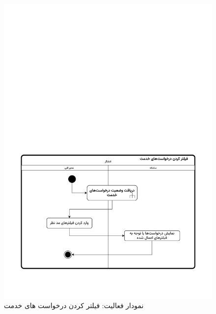 \begin{figure}[ht!]
	\centering
	\includegraphics[scale=0.8, page=1]{figs/OOD-activity-filterreqrep.pdf}
	\caption{نمودار فعالیت: فیلتر کردن درخواست های خدمت}
\end{figure}
\FloatBarrier
\newpage


